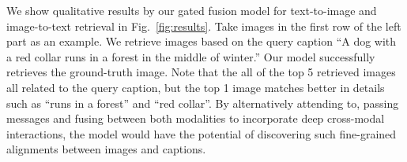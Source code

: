 \documentclass[10pt,twocolumn,letterpaper]{article}
\begin{document}
\vspace{-0.5mm}
We show qualitative results by our gated fusion model for text-to-image and image-to-text retrieval in Fig.~\ref{fig:results}. 
Take images in the first row of the left part as an example.
We retrieve images based on the query caption ``A dog with a red collar runs in a forest in the middle of winter.'' 
Our model successfully retrieves the ground-truth image. 
Note that the all of the top 5 retrieved images all related to the query caption, but the top 1 image matches better in details such as ``runs in a forest'' and ``red collar''.
By alternatively attending to, passing messages and fusing between both modalities to incorporate deep cross-modal interactions, the model would have the potential of discovering such fine-grained alignments between images and captions.
\end{document}
